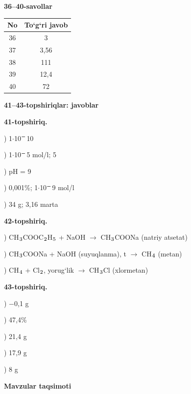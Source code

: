 \documentclass[11pt,a4paper]{article}
\renewcommand{\textsubscript}[1]{\ensuremath{_{\text{\fontsize{8}{8}\selectfont #1}}}}
\renewcommand{\textsuperscript}[1]{\ensuremath{^{\text{\fontsize{8}{8}\selectfont #1}}}}
\begin{document}
\noindent\textbf{36--40-savollar}\par\smallskip
\noindent\begin{tabular}{|c|c|}\hline \textbf{No} & \textbf{To`g`ri javob}\\\hline
36 & 3\\\hline
37 & 3,56\\\hline
38 & 111\\\hline
39 & 12,4\\\hline
40 & 72\\\hline
\end{tabular}\par\medskip
\noindent\textbf{41--43-topshiriqlar: javoblar}\par\smallskip
\noindent\textbf{41-topshiriq.}\par
{}) 1$\cdot$10\textsuperscript{$-$}10\par
{}) 1$\cdot$10\textsuperscript{$-$}5 mol/l; 5\par
{}) pH = 9\par
{}) 0,001\%; 1$\cdot$10\textsuperscript{$-$}9 mol/l\par
{}) 34 g; 3,16 marta\par
\noindent\textbf{42-topshiriq.}\par
{}) CH\textsubscript{3}COOC\textsubscript{2}H\textsubscript{5} + NaOH $\to$ CH\textsubscript{3}COONa (natriy atsetat)\par
{}) CH\textsubscript{3}COONa + NaOH (suyuqlanma), t\textdegree{} $\to$ CH\textsubscript{4} (metan)\par
{}) CH\textsubscript{4} + Cl\textsubscript{2}, yorug`lik $\to$ CH\textsubscript{3}Cl (xlormetan)\par
\noindent\textbf{43-topshiriq.}\par
{}) $-$0,1 g\par
{}) 47,4\%\par
{}) 21,4 g\par
{}) 17,9 g\par
{}) 8 g\par
\par\bigskip\noindent\textbf{Mavzular taqsimoti}\par\smallskip
\end{document}
